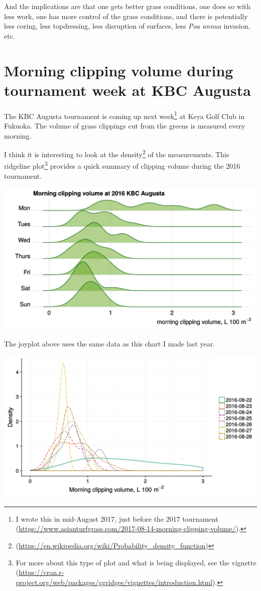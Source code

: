 \documentclass[12pt,b5,]{tufte-book}
\begin{document}
And the implications are that one gets better grass conditions, one does so with less work, one has more control of the grass conditions, and there is potentially less coring, less topdressing, less disruption of surfaces, less \emph{Poa annua} invasion, etc.

\hypertarget{morning-clipping-volume-during-tournament-week-at-kbc-augusta}{%
\chapter{Morning clipping volume during tournament week at KBC Augusta}\label{morning-clipping-volume-during-tournament-week-at-kbc-augusta}}

The KBC Augusta tournament is coming up next week\footnote{I wrote this in mid-August 2017, just before the 2017 tournament (\url{https://www.asianturfgrass.com/2017-08-14-morning-clipping-volume/}).} at Keya Golf Club in Fukuoka. The volume of grass clippings cut from the greens is measured every morning.

I think it is interesting to look at the density\footnote{(\url{https://en.wikipedia.org/wiki/Probability_density_function})} of the measurements. This ridgeline plot\footnote{For more about this type of plot and what is being displayed, see the vignette (\url{https://cran.r-project.org/web/packages/ggridges/vignettes/introduction.html}).} provides a quick summary of clipping volume during the 2016 tournament.

\includegraphics{img/b6-2.png}

The joyplot above uses the same data as this chart I made last year.

\includegraphics{img/b6-3.png}
\end{document}
